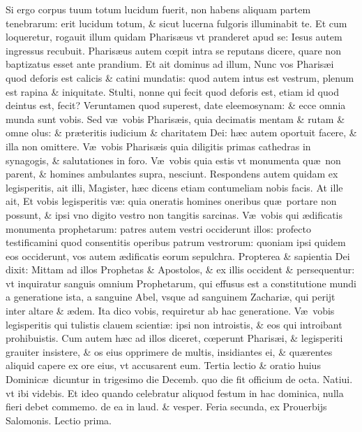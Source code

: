 \documentclass[a5paper,10pt]{book}
\def\ae{æ}
\def\oe{œ}
\begin{document}
\begin{multicols*}{2}
Si ergo corpus tuum totum lucidum fuerit, non habens aliquam partem tenebrarum: erit lucidum totum, \& sicut lucerna fulgoris illuminabit te.
Et cum loqueretur, rogauit illum quidam Pharis\ae us vt pranderet apud se: Iesus autem ingressus recubuit.
Pharis\ae us autem c\oe pit intra se reputans dicere, quare non baptizatus esset ante prandium.
Et ait dominus ad illum, Nunc vos Pharis\ae i quod deforis est calicis \& catini mundatis: quod autem intus est vestrum, plenum est rapina \& iniquitate.
Stulti, nonne qui fecit quod deforis est, etiam id quod deintus est, fecit? Veruntamen quod superest, date eleemosynam: \& ecce omnia munda sunt vobis.
Sed v\ae \ vobis Pharis\ae is, quia decimatis mentam \& rutam \& omne olus: \& pr\ae teritis iudicium \& charitatem Dei: h\ae c autem oportuit facere, \& illa non omittere.
V\ae \ vobis Pharis\ae is quia diligitis primas cathedras in synagogis, \& salutationes in foro.
V\ae \ vobis quia estis vt monumenta qu\ae \ non parent, \& homines ambulantes supra, nesciunt.
Respondens autem quidam ex legisperitis, ait illi, Magister, h\ae c dicens etiam contumeliam nobis facis.
At ille ait, Et vobis legisperitis v\ae : quia oneratis homines oneribus qu\ae \ portare non possunt, \& ipsi vno digito vestro non tangitis sarcinas.
V\ae \ vobis qui \ae dificatis monumenta prophetarum: patres autem vestri occiderunt illos: profecto testificamini quod consentitis operibus patrum vestrorum: quoniam ipsi quidem eos occiderunt, vos autem \ae dificatis eorum sepulchra.
Propterea \& sapientia Dei dixit: Mittam ad illos Prophetas \& Apostolos, \& ex illis occident \& persequentur: vt inquiratur sanguis omnium Prophetarum, qui effusus est a constitutione mundi a generatione ista, a sanguine Abel, vsque ad sanguinem Zachari\ae , qui perijt inter altare \& \ae dem.
Ita dico vobis, requiretur
ab hac generatione.
V\ae \ vobis legisperitis qui tulistis clauem scienti\ae : ipsi non introistis, \& eos qui introibant prohibuistis.
Cum autem h\ae c ad illos diceret, c\oe perunt Pharis\ae i, \& legisperiti grauiter insistere, \& os eius opprimere de multis, insidiantes ei, \& qu\ae rentes aliquid capere ex ore eius, vt accusarent eum.
\newline {} \color{red} Tertia lectio \& oratio huius Dominic\ae \ dicuntur in trigesimo die Decemb. quo die fit officium de octa. Natiui. vt ibi videbis. Et ideo quando celebratur aliquod festum in hac dominica, nulla fieri debet commemo. de ea in laud. \& vesper. \color{black}
\newline {} \color{red} \hypertarget{MON-PRIMA-POST-ADV}{Feria secunda,} ex Prouerbijs Salomonis. \hfill Lectio prima. \color{black}

\end{multicols*}
\end{document}
